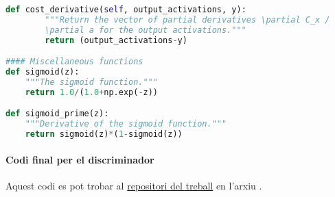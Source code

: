\begin{lstlisting}[language=Python, caption=Codi original per la xarxa neuronal clàssica]
	def cost_derivative(self, output_activations, y):
		"""Return the vector of partial derivatives \partial C_x /
		\partial a for the output activations."""
		return (output_activations-y)

#### Miscellaneous functions
def sigmoid(z):
	"""The sigmoid function."""
	return 1.0/(1.0+np.exp(-z))

def sigmoid_prime(z):
	"""Derivative of the sigmoid function."""
	return sigmoid(z)*(1-sigmoid(z))
\end{lstlisting}

\paragraph{Codi final per el discriminador}
\label{lst:disc_final}
Aquest codi es pot trobar al \href{https://github.com/tomiock/qGAN}{repositori del treball} en l'arxiu . 


